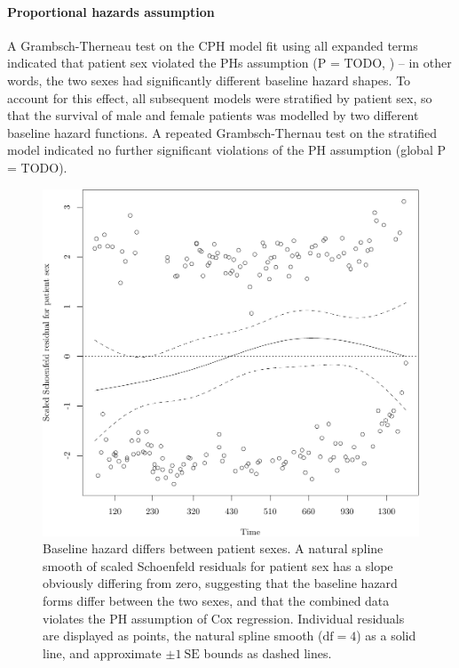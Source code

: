 \documentclass[dissertation.tex]{subfiles}
\begin{document}
\paragraph{Proportional hazards assumption}
A Grambsch-Therneau test \cite{Grambsch1994} on the \gls{CPH} model fit using all expanded terms indicated that patient sex violated the \glspl{PH} assumption (P = TODO, ) -- in other words, the two sexes had significantly different baseline hazard shapes.  To account for this effect, all subsequent models were stratified by patient sex, so that the survival of male and female patients was modelled by two different baseline hazard functions.  A repeated Grambsch-Thernau test on the stratified model indicated no further significant violations of the \gls{PH} assumption (global P = TODO).

\begin{figure}
\centering
  \includegraphics[width=.7\linewidth]{analysis/nomogram/figure/05-eda-ph-check-full-sexplot-1}
  \caption[Baseline hazard forms differ between patient sexes]{Baseline hazard differs between patient sexes.    
  A natural spline smooth of scaled Schoenfeld residuals for patient sex has a slope obviously differing from zero, suggesting that the baseline hazard forms differ between the two sexes, and that the combined data violates the \acrshort{PH} assumption of Cox regression.  Individual residuals are displayed as points, the natural spline smooth ($\mbox{df}=4$) as a solid line, and approximate $\pm 1\ \mbox{SE}$ bounds as dashed lines.}
\label{fig:nomo-ph-plot-sex}
\end{figure}
\end{document}
